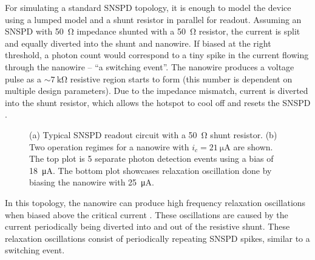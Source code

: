 For simulating a standard SNSPD topology, it is enough to model the device using a lumped model
and a shunt resistor in parallel for readout.
Assuming an SNSPD with \qty{50}{\ohm} impedance shunted with a \qty{50}{\ohm} resistor, 
the current is split and equally diverted into the shunt and nanowire.
If biased at the right threshold, a photon count would correspond to a tiny spike in 
the current flowing through the nanowire -- ``a switching event''. The nanowire 
produces a voltage pulse as a $\sim \qty{7}{\kilo\ohm}$ resistive region starts to form 
(this number is dependent on
multiple design parameters). Due to the impedance mismatch,
current is diverted into the shunt resistor, which allows the hotspot to cool off
and resets the SNSPD \cite{toomey_thesis}.


\begin{figure}
    \centering
    \caption{(a) Typical SNSPD readout circuit with a \qty{50}{\ohm} shunt resistor. (b)
    Two operation regimes for a nanowire with $i_c=\qty{21}{\micro\ampere}$ are shown. The top plot 
    is 5 separate photon detection events using a bias of \qty{18}{\micro\ampere}. The bottom plot
    showcases relaxation oscillation done by biasing the nanowire with \qty{25}{\micro\ampere}.}
    \label{fig:typical}
\end{figure}

In this topology, the nanowire can produce high frequency relaxation
oscillations when biased above the critical current \cite{relaxation_oscillations}.
These oscillations are caused by the
current periodically being diverted into and out of the resistive shunt. 
These relaxation oscillations consist of periodically repeating SNSPD spikes, 
similar to a switching event.

